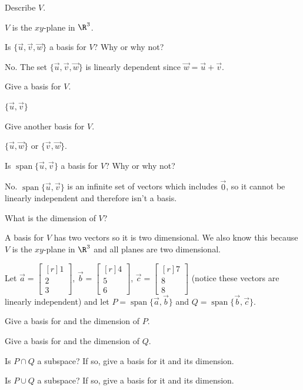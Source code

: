 \documentclass{problemset}
\DeclareMathOperator{\Span}{span}
\newcommand{\mat}[1]{\begin{bmatrix*}[r]#1\end{bmatrix*}}
\begin{document}
	\begin{parts}
		\item Describe $V$.
			\begin{solution}
				$V$ is the $xy$-plane in $\R^3$.
			\end{solution}
		\item Is $\{\vec u,\vec v,\vec w\}$ a basis for $V$?  Why or why not?
			\begin{solution}
				No. The set $\{\vec u,\vec v,\vec w\}$ is linearly dependent since $\vec w=\vec u+\vec v$.
			\end{solution}
		\item Give a basis for $V$.
			\begin{solution}
				$\{\vec u,\vec v\}$
			\end{solution}
		\item Give another basis for $V$.
			\begin{solution}
				$\{\vec u,\vec w\}$ or $\{\vec v,\vec w\}$.
			\end{solution}
		\item Is $\Span\{\vec u,\vec v\}$ a basis for $V$?  Why or why not?
			\begin{solution}
				No. $\Span\{\vec u,\vec v\}$ is an infinite set of vectors
				which includes $\vec 0$, so it cannot be linearly independent and
				therefore isn't a basis.
			\end{solution}
		\item What is the dimension of $V$?
			\begin{solution}
				A basis for $V$ has two vectors so it is two dimensional. We also
				know this because $V$ is the $xy$-plane in $\R^3$ and all planes are two
				dimensional.
			\end{solution}
	\end{parts}


	\question
	Let $\vec a=\mat{1\\2\\3}$, $\vec b=\mat{4\\5\\6}$, $\vec c=\mat{7\\8\\8}$ (notice these vectors
	are linearly independent) and 
	let $P=\Span\{\vec a,\vec b\}$ and $Q=\Span\{\vec b,\vec c\}$.
	\begin{parts}
		\item Give a basis for and the dimension of $P$.
		\item Give a basis for and the dimension of $Q$.
		\item Is $P\cap Q$ a subspace? If so, give a basis for it and its dimension.
		\item Is $P\cup Q$ a subspace? If so, give a basis for it and its dimension.
	\end{parts}
\end{document}
